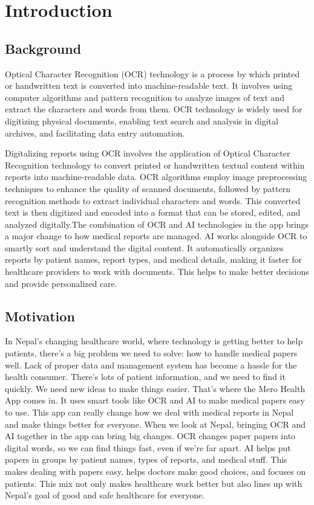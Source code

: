 \chapter{Introduction}\label{ch:overview}
\section{Background}
Optical Character Recognition (OCR) technology is a process by which printed or handwritten text is converted into machine-readable text. It involves using computer algorithms and pattern recognition to analyze images of text and extract the characters and words from them. OCR technology is widely used for digitizing physical documents, enabling text search and analysis in digital archives, and facilitating data entry automation.

\noindent
Digitalizing reports using OCR involves the application of Optical Character Recognition technology to convert printed or handwritten textual content within reports into machine-readable data. OCR algorithms employ image preprocessing techniques to enhance the quality of scanned documents, followed by pattern recognition methods to extract individual characters and words. This converted text is then digitized and encoded into a format that can be stored, edited, and analyzed digitally.The combination of OCR and AI technologies in the app brings a major change to how medical reports are managed. AI works alongside OCR to smartly sort and understand the digital content. It automatically organizes reports by patient names, report types, and medical details, making it faster for healthcare providers to work with documents. This helps to make better decisions and provide personalized care.


\section{Motivation}
In Nepal's changing healthcare world, where technology is getting better to help patients, there's a big problem we need to solve: how to handle medical papers well.
Lack of proper data and management system has become a hassle for the health consumer.
There's lots of patient information, and we need to find it quickly. We need new ideas to make things easier. That's where the Mero Health App comes in. It uses smart tools like OCR and AI to make medical papers easy to use. This app can really change how we deal with medical reports in Nepal and make things better for everyone. When we look at Nepal, bringing OCR and AI together in the app can bring big changes. OCR changes paper papers into digital words, so we can find things fast, even if we're far apart. AI helps put papers in groups by patient names, types of reports, and medical stuff. This makes dealing with papers easy, helps doctors make good choices, and focuses on patients. This mix not only makes healthcare work better but also lines up with Nepal's goal of good and safe healthcare for everyone.


